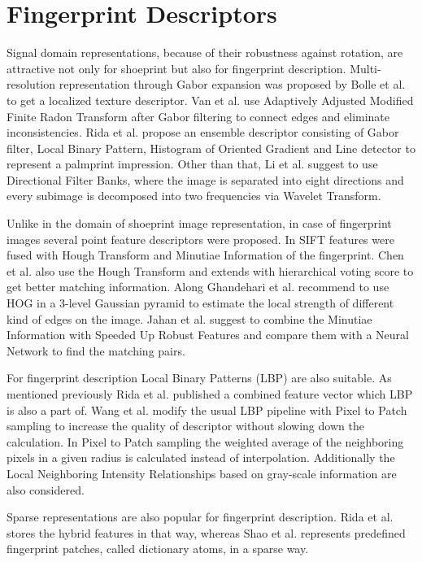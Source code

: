 \documentclass[draft,final]{vutinfth} %
\begin{document}
\section*{Fingerprint Descriptors}
\par
Signal domain representations, because of their robustness against rotation, are attractive not only for shoeprint but also for fingerprint description.
Multi-resolution representation through Gabor expansion was proposed by Bolle et al. \cite{bolle2012fingerprint} to get a localized texture descriptor.
Van et al. \cite{van2016fingerprint} use Adaptively Adjusted Modified Finite Radon Transform after Gabor filtering to connect edges and eliminate inconsistencies.
Rida et al. \cite{rida2018palmprint} propose an ensemble descriptor consisting of Gabor filter, Local Binary Pattern, Histogram of Oriented Gradient and Line detector to represent a palmprint impression.
Other than that, Li et al. \cite{li2012texture} suggest to use Directional Filter Banks, where the image is separated into eight directions and every subimage is decomposed into two frequencies via Wavelet Transform.
\par
Unlike in the domain of shoeprint image representation, in case of fingerprint images several point feature descriptors were proposed.
In \cite{zhou2011adaptive} SIFT features were fused with Hough Transform and Minutiae Information of the fingerprint.
Chen et al. \cite{chen2013hierarchical} also use the Hough Transform and extends with hierarchical voting score to get better matching information.
Along  \cite{rida2018palmprint} Ghandehari et al. \cite{ghandehari2012palmprint} recommend to use HOG in a 3-level Gaussian pyramid to estimate the local strength of different kind of edges on the image.
Jahan et al. \cite{jahan2017robust} suggest to combine the Minutiae Information with Speeded Up Robust Features and compare them with a Neural Network to find the matching pairs.
\par
For fingerprint description Local Binary Patterns (LBP) are also suitable.
As mentioned previously Rida et al. \cite{rida2018palmprint} published a combined feature vector which LBP is also a part of.
Wang et al. \cite{wang2013pixel} modify the usual LBP pipeline with Pixel to Patch sampling to increase the quality of descriptor without slowing down the calculation.
In Pixel to Patch sampling the weighted average of the neighboring pixels in a given radius is calculated instead of interpolation.
Additionally the Local Neighboring Intensity Relationships based on gray-scale information are also considered.
\par
Sparse representations are also popular for fingerprint description.
Rida et al. \cite{rida2018palmprint} stores the hybrid features in that way, whereas Shao et al. \cite{shao2013fingerprint} represents predefined fingerprint patches, called dictionary atoms, in a sparse way.
\end{document}

